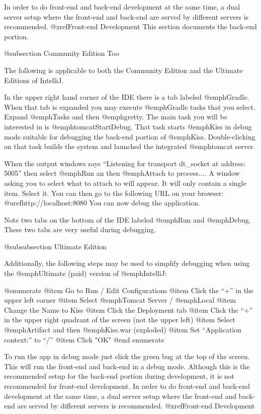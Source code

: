 In order to do front-end and back-end development at the same time, a dual server setup where
the front-end and back-end are served by different servers is recommended.  @xref{Front-end Development}
This section documents the back-end portion.

@subsection Community Edition Too

The following is applicable to both the Community Edition and the Ultimate Editions of IntelliJ.

In the upper right hand corner of the IDE there is a tab labeled @emph{Gradle}.  When that tab is expanded you may execute @emph{Gradle} tasks that you select.
Expand @emph{Tasks} and then @emph{gretty}.  The main task you will be interested in is @emph{tomcatStartDebug}.  That task starts @emph{Kiss}
in debug mode suitable for debugging the back-end portion of @emph{Kiss}.  Double-clicking on that task builds the system and launched the integrated @emph{tomcat}
server.  

When the output windows says ``Listening for transport dt_socket at address: 5005'' then select @emph{Run} an then @emph{Attach to process...}.
A window asking you to select what to attach to will appear.  It will only contain a single item.  Select it. You can then go to the following URL
on your browser:  @uref{http://localhost:8080}  You can now debug the application.

Note two tabs on the bottom of the IDE labeled @emph{Run} and @emph{Debug}.  These two tabs are very useful during debugging.



@subsubsection Ultimate Edition

Additionally, the following steps may be used to simplify debugging when using the @emph{Ultimate} (paid) version of @emph{IntelliJ}:



@enumerate
@item
Go to Run / Edit Configurations
@item
Click the ``+'' in the upper left corner
@item
Select @emph{Tomcat Server} / @emph{Local}
@item
Change the Name to Kiss
@item
Click the Deployment tab
@item
Click the ``+'' in the upper right quadrant of the screen (not the upper left)
@item
Select @emph{Artifact} and then @emph{Kiss.war} (exploded)
@item
Set ``Application context:'' to ``/''
@item
Click "OK"
@end enumerate

To run the app in debug mode just click the green bug at the top of the screen.  This will run the front-end and back-end 
in a debug mode.  Although this is the recommended setup for the back-end portion during development, it is not recommended
for front-end development.  In order to do front-end and back-end development at the same time, a dual server setup where
the front-end and back-end are served by different servers is recommended.    @xref{Front-end Development}

